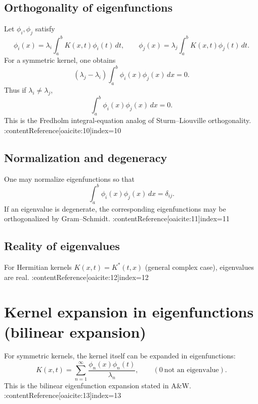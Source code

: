 \subsection{Orthogonality of eigenfunctions}
Let $\phi_i,\phi_j$ satisfy
\[
\phi_i(x)=\lambda_i\int_a^b K(x,t)\phi_i(t)\,dt,
\qquad
\phi_j(x)=\lambda_j\int_a^b K(x,t)\phi_j(t)\,dt.
\]
For a symmetric kernel, one obtains
\begin{equation}
(\lambda_j-\lambda_i)\int_a^b \phi_i(x)\phi_j(x)\,dx = 0.
\end{equation}
Thus if $\lambda_i\neq \lambda_j$,
\begin{equation}
\boxed{
\int_a^b \phi_i(x)\phi_j(x)\,dx = 0.
}
\end{equation}
This is the Fredholm integral-equation analog of Sturm--Liouville orthogonality. :contentReference[oaicite:10]{index=10}

\subsection{Normalization and degeneracy}
One may normalize eigenfunctions so that
\begin{equation}
\int_a^b \phi_i(x)\phi_j(x)\,dx=\delta_{ij}.
\end{equation}
If an eigenvalue is degenerate, the corresponding eigenfunctions may be orthogonalized
by Gram--Schmidt. :contentReference[oaicite:11]{index=11}

\subsection{Reality of eigenvalues}
For Hermitian kernels $K(x,t)=K^*(t,x)$ (general complex case), eigenvalues are real. :contentReference[oaicite:12]{index=12}


\section{Kernel expansion in eigenfunctions (bilinear expansion)}

For symmetric kernels, the kernel itself can be expanded in eigenfunctions:
\begin{equation}
\boxed{
K(x,t)=\sum_{n=1}^{\infty}\frac{\phi_n(x)\phi_n(t)}{\lambda_n},
\qquad (0\ \text{not an eigenvalue}).
}
\end{equation}
This is the bilinear eigenfunction expansion stated in A\&W. :contentReference[oaicite:13]{index=13}

